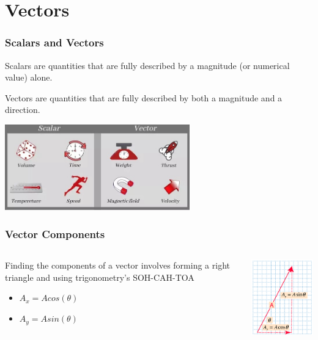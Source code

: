 \documentclass{beamer}
\begin{document}
\section{Vectors}

\begin{frame}\frametitle{Scalars and Vectors}
Scalars are quantities that are fully described by a magnitude (or numerical value) alone.

Vectors are quantities that are fully described by both a magnitude and a direction.

\vspace{0.25cm}
\begin{center}
\includegraphics[width=8cm]{fig/scalarVector.jpg}
\end{center}
\end{frame}


\begin{frame}\frametitle{Vector Components}
\begin{columns}
\begin{column}{6cm}
Finding the components of a vector involves forming a right triangle and using trigonometry's SOH-CAH-TOA
\begin{itemize}
\item $A_x = A cos(\theta)$
\item $A_y = A sin(\theta)$
\end{itemize}
\end{column}
\begin{column}{5cm}

\begin{center}
\includegraphics[width=4.8cm]{fig/vec5.png}
\end{center}
\end{column}
\end{columns}
\end{frame}
\end{document}
